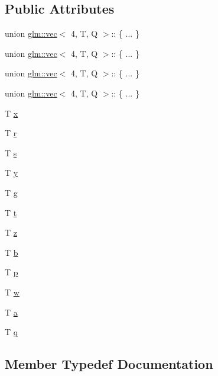 \subsection*{Public Attributes}
\begin{DoxyCompactItemize}
\item 
union \hyperlink{structglm_1_1vec}{glm\+::vec}$<$ 4, T, Q $>$\+:: \{ ... \}  
\item 
union \hyperlink{structglm_1_1vec}{glm\+::vec}$<$ 4, T, Q $>$\+:: \{ ... \}  
\item 
union \hyperlink{structglm_1_1vec}{glm\+::vec}$<$ 4, T, Q $>$\+:: \{ ... \}  
\item 
union \hyperlink{structglm_1_1vec}{glm\+::vec}$<$ 4, T, Q $>$\+:: \{ ... \}  
\item 
T \hyperlink{structglm_1_1vec_3_014_00_01_t_00_01_q_01_4_a4f0ee6c1ad138fad04c3918cba14d108}{x}
\item 
T \hyperlink{structglm_1_1vec_3_014_00_01_t_00_01_q_01_4_a2b985b974ca60ce93681865d0251adbd}{r}
\item 
T \hyperlink{structglm_1_1vec_3_014_00_01_t_00_01_q_01_4_af72c3f5a2b95f3b81b0b3a751b260fe7}{s}
\item 
T \hyperlink{structglm_1_1vec_3_014_00_01_t_00_01_q_01_4_a819e3f804a8e92a03b37abe5fa6f4df1}{y}
\item 
T \hyperlink{structglm_1_1vec_3_014_00_01_t_00_01_q_01_4_a74ae0e201ec1b0c9090d238deb1137aa}{g}
\item 
T \hyperlink{structglm_1_1vec_3_014_00_01_t_00_01_q_01_4_ab022af720f5053ff65c7ea8688289ce1}{t}
\item 
T \hyperlink{structglm_1_1vec_3_014_00_01_t_00_01_q_01_4_aef4c0898d2f91614ba5a747b8445a9d6}{z}
\item 
T \hyperlink{structglm_1_1vec_3_014_00_01_t_00_01_q_01_4_a632d331fa4a8414d4bb81df66bc722cb}{b}
\item 
T \hyperlink{structglm_1_1vec_3_014_00_01_t_00_01_q_01_4_a026c2fbd55de199bf5888b63c7eea3d2}{p}
\item 
T \hyperlink{structglm_1_1vec_3_014_00_01_t_00_01_q_01_4_a72b956e1e8cce70057f78520dd4e1c90}{w}
\item 
T \hyperlink{structglm_1_1vec_3_014_00_01_t_00_01_q_01_4_a2c591708237bac7d2047ff5af383a012}{a}
\item 
T \hyperlink{structglm_1_1vec_3_014_00_01_t_00_01_q_01_4_a206e0f1edc2115cde3a7d31c131982ae}{q}
\end{DoxyCompactItemize}


\subsection{Member Typedef Documentation}
\mbox{\label{structglm_1_1vec_3_014_00_01_t_00_01_q_01_4_a175b3fdeb819aab912118ac1605b675b}} 
